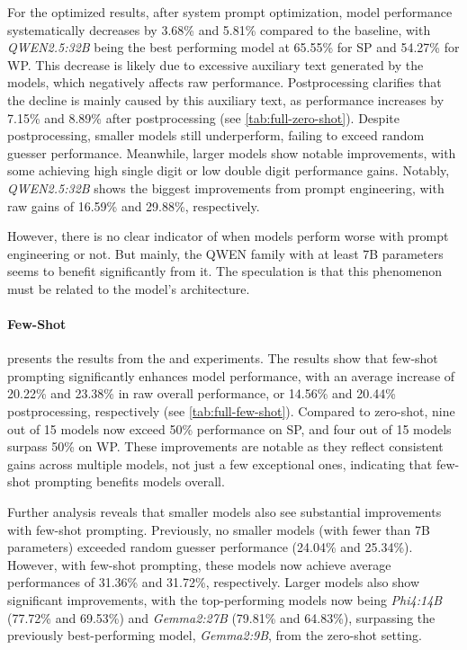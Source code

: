 For the optimized results, after system prompt optimization, model performance systematically decreases by 3.68\% and 5.81\% compared to the baseline, with \textit{QWEN2.5:32B} being the best performing model at 65.55\% for \ac{SP} and 54.27\% for \ac{WP}. This decrease is likely due to excessive auxiliary text generated by the models, which negatively affects raw performance. Postprocessing clarifies that the decline is mainly caused by this auxiliary text, as performance increases by 7.15\% and 8.89\% after postprocessing (see \cref{tab:full-zero-shot}). Despite postprocessing, smaller models still underperform, failing to exceed random guesser performance. Meanwhile, larger models show notable improvements, with some achieving high single digit or low double digit performance gains. Notably, \textit{QWEN2.5:32B} shows the biggest improvements from prompt engineering, with raw gains of 16.59\% and 29.88\%, respectively.

However, there is no clear indicator of when models perform worse with prompt engineering or not. But mainly, the QWEN family with at least 7B parameters seems to benefit significantly from it. The speculation is that this phenomenon must be related to the model's architecture.

\paragraph{Few-Shot}

 presents the results from the  and  experiments. The results show that few-shot prompting significantly enhances model performance, with an average increase of 20.22\% and 23.38\% in raw overall performance, or 14.56\% and 20.44\% postprocessing, respectively (see \cref{tab:full-few-shot}). Compared to zero-shot, nine out of 15 models now exceed 50\% performance on \ac{SP}, and four out of 15 models surpass 50\% on \ac{WP}. These improvements are notable as they reflect consistent gains across multiple models, not just a few exceptional ones, indicating that few-shot prompting benefits models overall.

Further analysis reveals that smaller models also see substantial improvements with few-shot prompting. Previously, no smaller models (with fewer than 7B parameters) exceeded random guesser performance (24.04\% and 25.34\%). However, with few-shot prompting, these models now achieve average performances of 31.36\% and 31.72\%, respectively. Larger models also show significant improvements, with the top-performing models now being \textit{Phi4:14B} (77.72\% and 69.53\%) and \textit{Gemma2:27B} (79.81\% and 64.83\%), surpassing the previously best-performing model, \textit{Gemma2:9B}, from the zero-shot setting.

